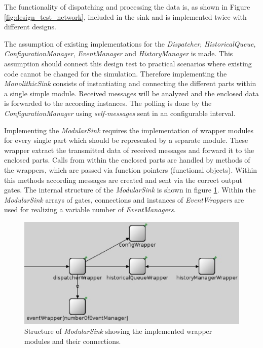The functionality of dispatching and processing the data is, as shown in Figure \ref{fig:design_test_network}, included in the sink and is implemented twice with different designs.

The assumption of existing implementations for the \emph{Dispatcher}, \emph{HistoricalQueue}, \emph{ConfigurationManager}, \emph{EventManager} and \emph{HistoryManager} is made.
This assumption should connect this design test to practical scenarios where existing code cannot be changed for the simulation.
Therefore implementing the \emph{MonolithicSink} consists of instantiating and connecting the different parts within a single simple module.
Received messages will be analyzed and the enclosed data is forwarded to the according instances.
The polling is done by the \emph{ConfigurationManager} using \emph{self-messages} sent in an configurable interval.

Implementing the \emph{ModularSink} requires the implementation of wrapper modules for every single part which should be represented by a separate module.
These wrapper extract the transmitted data of received messages and forward it to the enclosed parts.
Calls from within the enclosed parts are handled by methods of the wrappers, which are passed via function pointers (functional objects).
Within this methods according messages are created and sent via the correct output gates.
The internal structure of the \emph{ModularSink} is shown in figure \ref{fig:ModularSink}.
Within the \emph{ModularSink} arrays of gates, connections and instances of \emph{EventWrappers} are used for realizing a variable number of \emph{EventManagers}.

\begin{figure}
    \centering
    \includegraphics[width=0.9\linewidth]{images/ModularSink}
    \caption{Structure of \emph{ModularSink} showing the implemented wrapper modules and their connections.}
    \label{fig:ModularSink}
\end{figure}

